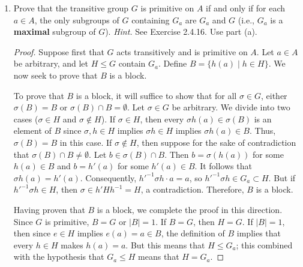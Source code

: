 \documentclass[../psets.tex]{subfiles}
\begin{document}
\begin{enumerate}
\begin{enumerate}[label={\textbf{\arabic*.}}]
\begin{enumerate}[label={\textbf{(\alph*)}}]
\begin{proof}
                To prove that $D_8$ is not primitive on $A$ (where $1,2,3,4$ denote the four vertices of a square going clockwise), it will suffice to find a block $B\subset A$ with cardinality not equal to 1 or 4. Choose $B=\{1,3\}$. Then if $r$ is a clockwise rotation by \ang{90} and $s$ is a reflection along the diagonal from vertex 1 to 3, $e,r^2,s,sr^2:B\mapsto B$ and $r,r^3,sr,sr^3:B\mapsto A\setminus B$.
            \end{proof}
            \item Prove that the transitive group $G$ is primitive on $A$ if and only if for each $a\in A$, the only subgroups of $G$ containing $G_a$ are $G_a$ and $G$ (i.e., $G_a$ is a \textbf{maximal} subgroup of $G$). \emph{Hint.} See Exercise 2.4.16. Use part (a).
            \begin{proof}
                Suppose first that $G$ acts transitively and is primitive on $A$. Let $a\in A$ be arbitrary, and let $H\leq G$ contain $G_a$. Define $B=\{h(a)\mid h\in H\}$. We now seek to prove that $B$ is a block.\par
                To prove that $B$ is a block, it will suffice to show that for all $\sigma\in G$, either $\sigma(B)=B$ or $\sigma(B)\cap B=\emptyset$. Let $\sigma\in G$ be arbitrary. We divide into two cases ($\sigma\in H$ and $\sigma\notin H$). If $\sigma\in H$, then every $\sigma h(a)\in\sigma(B)$ is an element of $B$ since $\sigma,h\in H$ implies $\sigma h\in H$ implies $\sigma h(a)\in B$. Thus, $\sigma(B)=B$ in this case. If $\sigma\notin H$, then suppose for the sake of contradiction that $\sigma(B)\cap B\neq\emptyset$. Let $b\in\sigma(B)\cap B$. Then $b=\sigma(h(a))$ for some $h(a)\in B$ and $b=h'(a)$ for some $h'(a)\in B$. It follows that $\sigma h(a)=h'(a)$. Consequently, ${h'}^{-1}\sigma h\cdot a=a$, so ${h'}^{-1}\sigma h\in G_a\subset H$. But if ${h'}^{-1}\sigma h\in H$, then $\sigma\in h'Hh^{-1}=H$, a contradiction. Therefore, $B$ is a block.\par
                Having proven that $B$ is a block, we complete the proof in this direction. Since $G$ is primitive, $B=G$ or $|B|=1$. If $B=G$, then $H=G$. If $|B|=1$, then since $e\in H$ implies $e(a)=a\in B$, the definition of $B$ implies that every $h\in H$ makes $h(a)=a$. But this means that $H\leq G_a$; this combined with the hypothesis that $G_a\leq H$ means that $H=G_a$.\par\medskip

\end{proof}
\end{enumerate}
\end{enumerate}
\end{enumerate}
\end{document}

